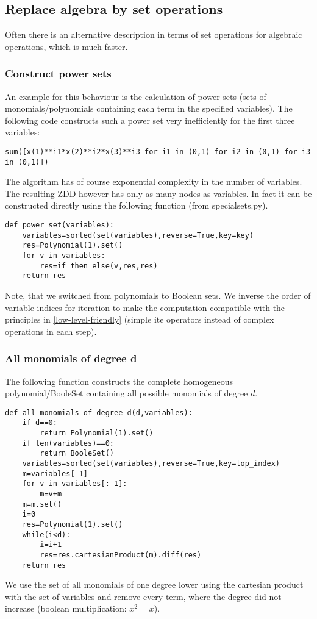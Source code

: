 \documentclass[]{article}
\newcommand{\ite}{{ite}\xspace}
\newcounter{thm}
\begin{document}
\subsection{Replace algebra by set operations}
Often there is an alternative description in terms of set operations for algebraic operations, which is much faster.

\subsubsection{Construct power sets}
An example for this behaviour is the calculation of power sets (sets of monomials/polynomials containing each term in the specified variables).
The following code constructs such a power set very inefficiently for the first three variables:
\begin{lstlisting}
sum([x(1)**i1*x(2)**i2*x(3)**i3 for i1 in (0,1) for i2 in (0,1) for i3 in (0,1)])
\end{lstlisting}
The algorithm has of course exponential complexity in the number of variables.
The resulting ZDD however has only as many nodes as variables.
In fact it can be constructed directly using the following function (from specialsets.py).
\begin{lstlisting}
def power_set(variables):
    variables=sorted(set(variables),reverse=True,key=key)
    res=Polynomial(1).set()
    for v in variables:
        res=if_then_else(v,res,res)
    return res 
\end{lstlisting}
Note, that we switched from polynomials to Boolean sets. We inverse the order of variable indices for iteration to make the computation compatible with the principles in \ref{low-level-friendly} (simple \ite operators instead of complex operations in each step).

\subsubsection{All monomials of degree d}
\label{all-monomials-set-operations}
The following function constructs the complete homogeneous polynomial/BooleSet containing all possible monomials of degree $d$.
\begin{lstlisting}
def all_monomials_of_degree_d(d,variables):
    if d==0:
        return Polynomial(1).set()
    if len(variables)==0:
        return BooleSet()
    variables=sorted(set(variables),reverse=True,key=top_index)
    m=variables[-1]
    for v in variables[:-1]:
        m=v+m
    m=m.set()
    i=0
    res=Polynomial(1).set()
    while(i<d):
        i=i+1
        res=res.cartesianProduct(m).diff(res)
    return res
\end{lstlisting}
We use the set of all monomials of one degree lower using the cartesian product with the set of variables and remove every term, where the degree did not increase (boolean multiplication: $x^2=x$).
\end{document}
